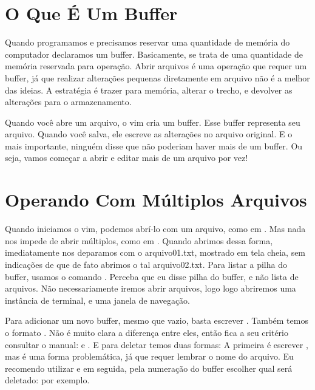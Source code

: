 \section{O Que É Um Buffer}
Quando programamos e precisamos reservar uma quantidade de memória do computador declaramos um buffer.
Basicamente, se trata de uma quantidade de memória reservada para operação.
Abrir arquivos é uma operação que requer um buffer, já que realizar alterações pequenas diretamente em arquivo
não é a melhor das ideias.
A estratégia é trazer para memória, alterar o trecho, e devolver as alterações para o armazenamento.

Quando você abre um arquivo, o vim cria um buffer.
Esse buffer representa seu arquivo.
Quando você salva, ele escreve as alterações no arquivo original.
E o mais importante, ninguém disse que não poderiam haver mais de um buffer.
Ou seja, vamos começar a abrir e editar mais de um arquivo por vez!

\section{Operando Com Múltiplos Arquivos}
Quando iniciamos o vim, podemos abrí-lo com um arquivo, como em .
Mas nada nos impede de abrir múltiplos, como em .
Quando abrimos dessa forma, imediatamente nos deparamos com o arquivo01.txt, mostrado em tela cheia,
sem indicações de que de fato abrimos o tal arquivo02.txt.
Para listar a pilha do buffer, usamos o comando .
Perceba que eu disse pilha do buffer, e não lista de arquivos.
Não necessariamente iremos abrir arquivos, logo logo abriremos uma instância de terminal, e uma janela de navegação.


Para adicionar um novo buffer, mesmo que vazio, basta escrever \newline
{}.
Também temos o formato .
Não é muito clara a diferença entre eles, então fica a seu critério consultar o manual:  e .
E para deletar temos duas formas: A primeira é escrever , mas
é uma forma problemática, já que requer lembrar o nome do arquivo.
Eu recomendo utilizar  e em seguida, pela numeração do buffer escolher qual será deletado:
 por exemplo.

